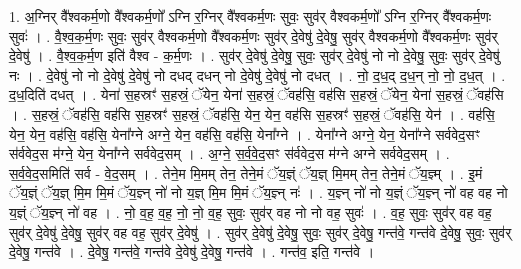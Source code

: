 \documentclass[17pt]{extarticle}
\begin{document}
1. अ॒ग्निर् वै᳚श्वकर्म॒णो वै᳚श्वकर्म॒णो᳚ ऽग्नि र॒ग्निर् वै᳚श्वकर्म॒णः सुवः॒ सुव॑र् वैश्वकर्म॒णो᳚ ऽग्नि र॒ग्निर् वै᳚श्वकर्म॒णः सुवः॑ । . वै॒श्व॒क॒र्म॒णः सुवः॒ सुव॑र् वैश्वकर्म॒णो वै᳚श्वकर्म॒णः सुव॑र् दे॒वेषु॑ दे॒वेषु॒ सुव॑र् वैश्वकर्म॒णो वै᳚श्वकर्म॒णः सुव॑र् दे॒वेषु॑ । . वै॒श्व॒क॒र्म॒ण इति॑ वैश्व - क॒र्म॒णः । . सुव॑र् दे॒वेषु॑ दे॒वेषु॒ सुवः॒ सुव॑र् दे॒वेषु॑ नो नो दे॒वेषु॒ सुवः॒ सुव॑र् दे॒वेषु॑ नः । . दे॒वेषु॑ नो नो दे॒वेषु॑ दे॒वेषु॑ नो दधद् दधन् नो दे॒वेषु॑ दे॒वेषु॑ नो दधत् । . नो॒ द॒ध॒द् द॒ध॒न् नो॒ नो॒ द॒ध॒त् । . द॒ध॒दिति॑ दधत् । . येना॑ स॒हस्रꣳ॑ स॒हस्रं॒ ॅयेन॒ येना॑ स॒हस्रं॒ ॅवह॑सि॒ वह॑सि स॒हस्रं॒ ॅयेन॒ येना॑ स॒हस्रं॒ ॅवह॑सि । . स॒हस्रं॒ ॅवह॑सि॒ वह॑सि स॒हस्रꣳ॑ स॒हस्रं॒ ॅवह॑सि॒ येन॒ येन॒ वह॑सि स॒हस्रꣳ॑ स॒हस्रं॒ ॅवह॑सि॒ येन॑ । . वह॑सि॒ येन॒ येन॒ वह॑सि॒ वह॑सि॒ येना᳚ग्ने अग्ने॒ येन॒ वह॑सि॒ वह॑सि॒ येना᳚ग्ने । . येना᳚ग्ने अग्ने॒ येन॒ येना᳚ग्ने सर्ववेद॒सꣳ स॑र्ववेद॒स म॑ग्ने॒ येन॒ येना᳚ग्ने सर्ववेद॒सम् । . अ॒ग्ने॒ स॒र्व॒वे॒द॒सꣳ स॑र्ववेद॒स म॑ग्ने अग्ने सर्ववेद॒सम् । . स॒र्व॒वे॒द॒समिति॑ सर्व - वे॒द॒सम् । . तेने॒म मि॒मम् तेन॒ तेने॒मं ॅय॒ज्ञ्ं ॅय॒ज्ञ् मि॒मम् तेन॒ तेने॒मं ॅय॒ज्ञ्म् । . इ॒मं ॅय॒ज्ञ्ं ॅय॒ज्ञ् मि॒म मि॒मं ॅय॒ज्ञ्न् नो॑ नो य॒ज्ञ् मि॒म मि॒मं ॅय॒ज्ञ्न् नः॑ । . य॒ज्ञ्न् नो॑ नो य॒ज्ञ्ं ॅय॒ज्ञ्न् नो॑ वह वह नो य॒ज्ञ्ं ॅय॒ज्ञ्न् नो॑ वह । . नो॒ व॒ह॒ व॒ह॒ नो॒ नो॒ व॒ह॒ सुवः॒ सुव॑र् वह नो नो वह॒ सुवः॑ । . व॒ह॒ सुवः॒ सुव॑र् वह वह॒ सुव॑र् दे॒वेषु॑ दे॒वेषु॒ सुव॑र् वह वह॒ सुव॑र् दे॒वेषु॑ । . सुव॑र् दे॒वेषु॑ दे॒वेषु॒ सुवः॒ सुव॑र् दे॒वेषु॒ गन्त॑वे॒ गन्त॑वे दे॒वेषु॒ सुवः॒ सुव॑र् दे॒वेषु॒ गन्त॑वे । . दे॒वेषु॒ गन्त॑वे॒ गन्त॑वे दे॒वेषु॑ दे॒वेषु॒ गन्त॑वे । . गन्त॑व॒ इति॒ गन्त॑वे । \newline
\end{document}

